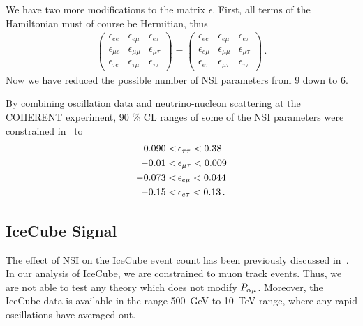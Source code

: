 We have two more modifications to the matrix $\epsilon$. First, all terms of the Hamiltonian must of course be Hermitian, thus
\begin{align}
    \begin{pmatrix}
        \epsilon_{ee} & \epsilon_{e\mu} & \epsilon_{e\tau}  \\
        \epsilon_{\mu e} & \epsilon_{\mu\mu} & \epsilon_{\mu\tau}  \\
        \epsilon_{\tau e} & \epsilon_{\tau\mu} & \epsilon_{\tau\tau}
    \end{pmatrix} =
    \begin{pmatrix}
        \epsilon_{ee} & \epsilon_{e\mu} & \epsilon_{e\tau}  \\
        \epsilon_{e \mu} & \epsilon_{\mu\mu} & \epsilon_{\mu\tau}  \\
        \epsilon_{e\tau} & \epsilon_{\mu\tau} & \epsilon_{\tau\tau}
    \end{pmatrix}\,.
\end{align}
Now we have reduced the possible number of NSI parameters from 9 down to 6. 

By combining oscillation data and neutrino-nucleon scattering at the COHERENT experiment, 90 \% CL ranges of some of 
the NSI parameters were constrained in~\cite{coherent} to
\begin{align}\label{eq:coherentbounds}
    -0.090 < &\,\epsilon_{\tau\tau} < 0.38 \nonumber \\
    -0.01 < &\,\epsilon_{\mu\tau} < 0.009 \nonumber \\
    -0.073 < &\,\epsilon_{e\mu} < 0.044 \nonumber \\
    -0.15 < &\,\epsilon_{e\tau} < 0.13\,.
\end{align}


\subsection{IceCube Signal}
The effect of NSI on the IceCube event count has been previously discussed in~\cite{salvadoNSI, DC2021, nsiFarzan}.
In our analysis of IceCube, we are constrained to muon track events. Thus, we are not able to test any theory which does not modify $P_{\alpha \mu}$. Moreover,
the IceCube data is available in the range \SI{500}{\GeV} to \SI{10}{\TeV} range, where any rapid oscillations have averaged out.

